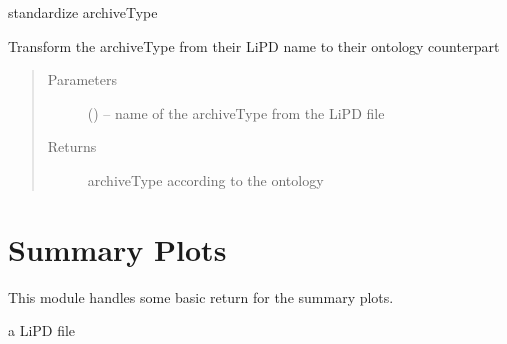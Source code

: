 \documentclass[letterpaper,10pt,english]{sphinxmanual}
\begin{document}
\begin{fulllineitems}
\label{\detokenize{LipdUtils:pyleoclim.LipdUtils.LipdToOntology}}
standardize archiveType

Transform the archiveType from their LiPD name to their ontology counterpart
\begin{quote}\begin{description}
\item[{Parameters}] \leavevmode
{} () -- name of the archiveType from the LiPD file

\item[{Returns}] \leavevmode
archiveType according to the ontology

\end{description}\end{quote}

\end{fulllineitems}



\chapter{Summary Plots}
\label{\detokenize{SummaryPlots:summary-plots}}\label{\detokenize{SummaryPlots::doc}}
This module handles some basic return for the summary plots.

 a LiPD file
\end{document}
